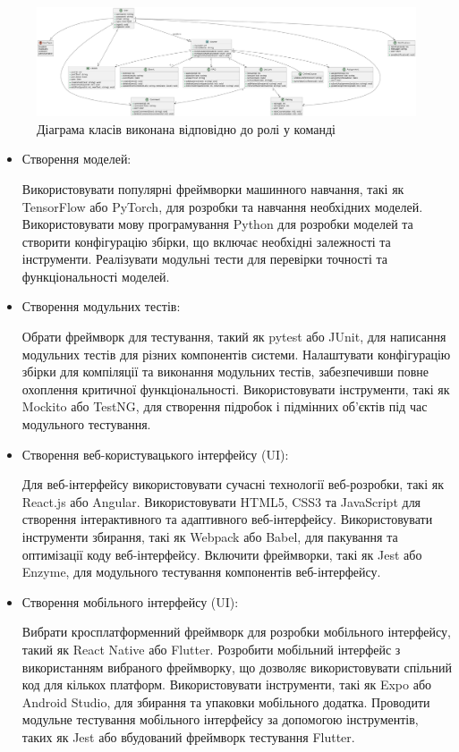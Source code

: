 \documentclass[oneside,14pt]{extarticle}
\begin{document}
\begin{normalsize}
	\begin{figure}[H]
		\centering
		\includegraphics[width=\textwidth]{class}
		\caption{Діаграма класів виконана відповідно до ролі у команді}
	\end{figure}
	\begin{itemize}
		\item Створення моделей:
		
    Використовувати популярні фреймворки машинного навчання, такі як TensorFlow або PyTorch, для розробки та навчання необхідних моделей.
Використовувати мову програмування Python для розробки моделей та створити конфігурацію збірки, що включає необхідні залежності та інструменти.
Реалізувати модульні тести для перевірки точності та функціональності моделей.
	
	\item 	Створення модульних тестів:
	
    Обрати фреймворк для тестування, такий як pytest або JUnit, для написання модульних тестів для різних компонентів системи.
Налаштувати конфігурацію збірки для компіляції та виконання модульних тестів, забезпечивши повне охоплення критичної функціональності.
Використовувати інструменти, такі як Mockito або TestNG, для створення підробок і підмінних об'єктів під час модульного тестування.
	
	\item Створення веб-користувацького інтерфейсу (UI):
	
    Для веб-інтерфейсу використовувати сучасні технології веб-розробки, такі як React.js або Angular.
Використовувати HTML5, CSS3 та JavaScript для створення інтерактивного та адаптивного веб-інтерфейсу.
Використовувати інструменти збирання, такі як Webpack або Babel, для пакування та оптимізації коду веб-інтерфейсу.
Включити фреймворки, такі як Jest або Enzyme, для модульного тестування компонентів веб-інтерфейсу.
	
	\item Створення мобільного інтерфейсу (UI):
	
    Вибрати кросплатформенний фреймворк для розробки мобільного інтерфейсу, такий як React Native або Flutter.
Розробити мобільний інтерфейс з використанням вибраного фреймворку, що дозволяє використовувати спільний код для кількох платформ.
Використовувати інструменти, такі як Expo або Android Studio, для збирання та упаковки мобільного додатка.
Проводити модульне тестування мобільного інтерфейсу за допомогою інструментів, таких як Jest або вбудований фреймворк тестування Flutter.
	

\end{itemize}
\end{normalsize}
\end{document}
